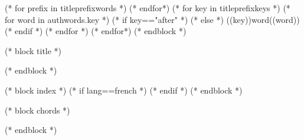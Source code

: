 
   (* for prefix in titleprefixwords *)
   (* endfor*)
   (* for key in titleprefixkeys *)
      (* for word in authwords.key *)
      (* if key=="after" *)
      (* else *)
      \auth((key))word{((word))}
      (* endif *)
      (* endfor *)
   (* endfor*)
(* endblock *)

(* block title *)
\maketitle
(* endblock *)

(* block index *)
   (* if lang==french *)
   (* endif *)
(* endblock *)

(* block chords *)
   \ifchorded
   \chords
   \fi
(* endblock *)

